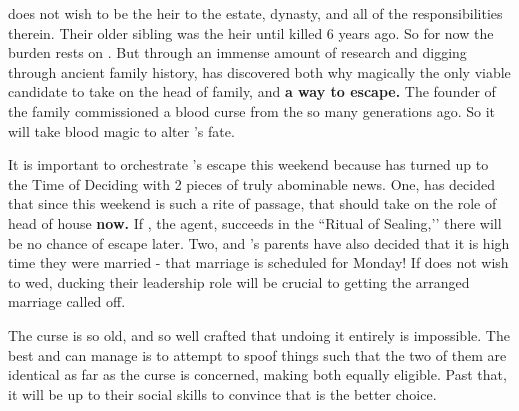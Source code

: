 \documentclass[green]{GL2020}
\begin{document}
\name{\gFaledonHeir{}}

\cHeir{\full} does not wish to be the heir to the \cFaledonParent{\formal} estate, dynasty, and all of the responsibilities therein. Their older sibling \cHeirSibling{\full} was the heir until \cHeirSibling{\they} \cHeirSibling{\were} killed 6 years ago. So for now the burden rests on \cHeir{}. But through an immense amount of research and digging through ancient family history, \cHeir{} has discovered both why \cHeir{\theyare} magically the only viable candidate to take on the head of family, and \textbf{a way to escape.} The founder of the \cFaledonParent{\formal} family commissioned a blood curse from the \pFarm{} so many generations ago. So it will take blood magic to alter \cHeir{}’s fate. 

It is important to orchestrate \cHeir{}’s escape this weekend because \cDiplomat{\full} has turned up to the Time of Deciding with 2 pieces of truly abominable news. One, \cFaledonParent{\full} has decided that since this weekend is such a rite of passage, that \cHeir{} should take on the role of head of house \textbf{now.} If \cDiplomat{}, the \cFaledonParent{\formal} agent, succeeds in the ``Ritual of Sealing,’’ there will be no chance of escape later. Two, \cHeir{} and \cChupStudent{\full}’s parents have also decided that it is high time they were married - that marriage is scheduled for Monday! If \cHeir{} does not wish to wed, ducking their leadership role will be crucial to getting the arranged marriage called off.

The curse is so old, and so well crafted that undoing it entirely is impossible. The best \cHeir{} and \cAmbition{\full} can manage is to attempt to spoof things such that the two of them are identical as far as the curse is concerned, making both equally eligible. Past that, it will be up to their social skills to convince \cDiplomat{} that \cAmbition{} is the better choice.
\end{document}

